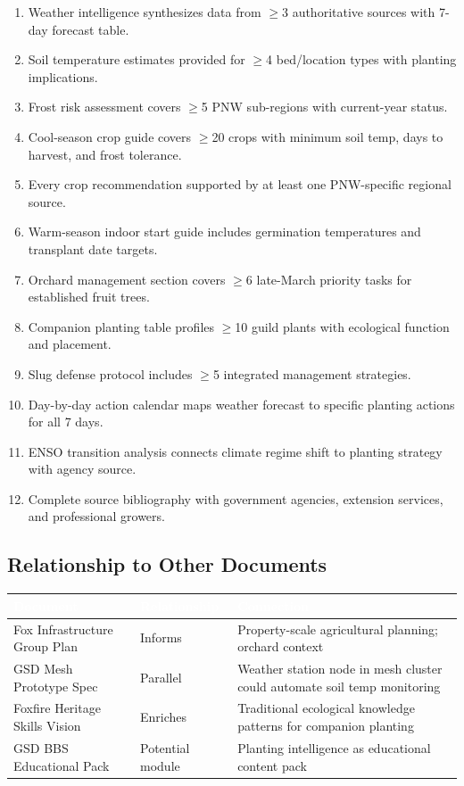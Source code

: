 \documentclass[11pt,letterpaper]{article}
\newcommand{\tableheader}[1]{\textbf{\sffamily\textcolor{white}{#1}}}
\begin{document}
\begin{enumerate}[leftmargin=*]
\item Weather intelligence synthesizes data from $\geq$3 authoritative sources with 7-day forecast table.
\item Soil temperature estimates provided for $\geq$4 bed/location types with planting implications.
\item Frost risk assessment covers $\geq$5 PNW sub-regions with current-year status.
\item Cool-season crop guide covers $\geq$20 crops with minimum soil temp, days to harvest, and frost tolerance.
\item Every crop recommendation supported by at least one PNW-specific regional source.
\item Warm-season indoor start guide includes germination temperatures and transplant date targets.
\item Orchard management section covers $\geq$6 late-March priority tasks for established fruit trees.
\item Companion planting table profiles $\geq$10 guild plants with ecological function and placement.
\item Slug defense protocol includes $\geq$5 integrated management strategies.
\item Day-by-day action calendar maps weather forecast to specific planting actions for all 7 days.
\item ENSO transition analysis connects climate regime shift to planting strategy with agency source.
\item Complete source bibliography with government agencies, extension services, and professional growers.
\end{enumerate}

\subsection{Relationship to Other Documents}

\begin{center}
\begin{tabularx}{\textwidth}{L{4cm}L{3cm}X}
\toprule
{}
\tableheader{Document} & \tableheader{Relationship} & \tableheader{Connection} \\
\midrule
Fox Infrastructure Group Plan & Informs & Property-scale agricultural planning; orchard context \\
GSD Mesh Prototype Spec & Parallel & Weather station node in mesh cluster could automate soil temp monitoring \\
Foxfire Heritage Skills Vision & Enriches & Traditional ecological knowledge patterns for companion planting \\
GSD BBS Educational Pack & Potential module & Planting intelligence as educational content pack \\
\bottomrule
\end{tabularx}
\end{center}
\end{document}
